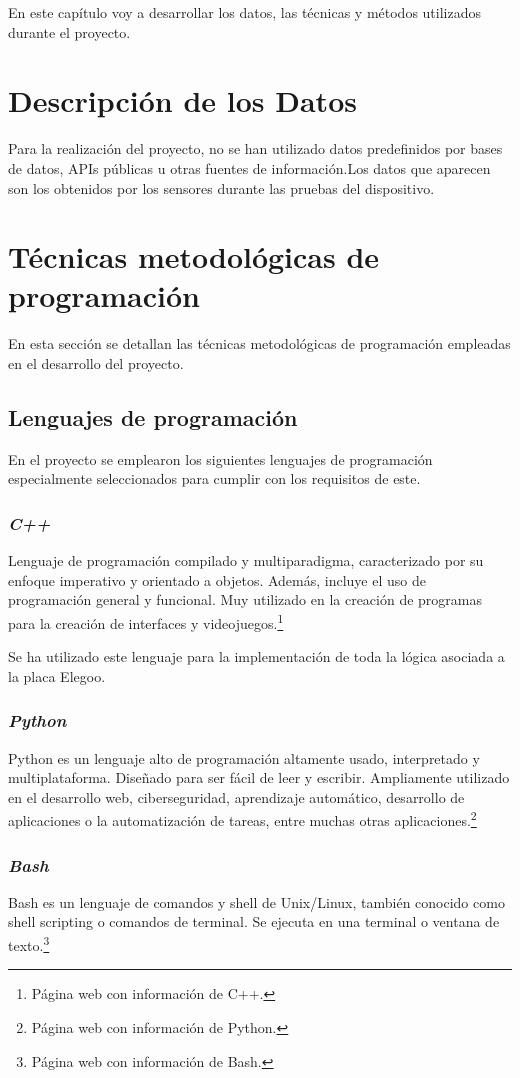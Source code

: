 En este capítulo voy a desarrollar los datos, las técnicas y métodos utilizados durante el proyecto. 
\section{Descripción de los Datos}
Para la realización del proyecto, no se han utilizado datos predefinidos por bases de datos, APIs públicas u otras fuentes de información.Los datos que aparecen son los obtenidos por los sensores durante las pruebas del dispositivo.
\section{Técnicas metodológicas de programación}
En esta sección se detallan las técnicas metodológicas de programación empleadas en el desarrollo del proyecto. 
\subsection{Lenguajes de programación}
En el proyecto se emplearon los siguientes lenguajes de programación especialmente seleccionados para cumplir con los requisitos de este.
\subsubsection{\textit{C++}}
Lenguaje de programación compilado y multiparadigma, caracterizado por su enfoque imperativo y orientado a objetos. Además, incluye el uso de programación general y funcional.
Muy utilizado en la creación de programas para la creación de interfaces y videojuegos.\cite{C++}\footnote{Página web con información de C++\cite{C++}.}

Se ha utilizado este lenguaje para la implementación de toda la lógica asociada a la placa Elegoo.
\subsubsection{\textit{Python}}
Python es un lenguaje alto de programación altamente usado, interpretado y multiplataforma. Diseñado para ser fácil de leer y escribir.
Ampliamente utilizado en el desarrollo web, ciberseguridad, aprendizaje automático, desarrollo de aplicaciones o la automatización de tareas, entre muchas otras aplicaciones.\cite{Python}\footnote{Página web con información de Python\cite{Python}.}
\subsubsection{\textit{Bash}}
Bash es un lenguaje de comandos y shell de Unix/Linux, también conocido como shell scripting o comandos de terminal.
Se ejecuta en una terminal o ventana de texto.\cite{Bash}\footnote{Página web con información de Bash\cite{Bash}.}

